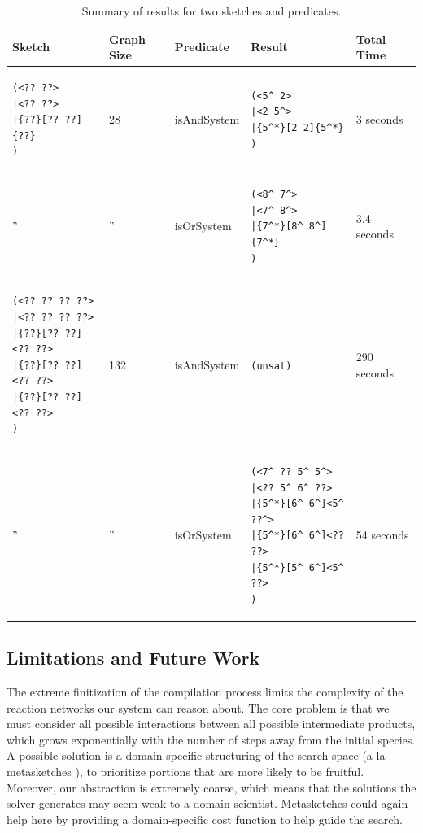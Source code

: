 \documentclass{article}[10pt]
\begin{document}
\begin{table}
\centering
\begin{tabular}{|l|l|l|l|l|}\hline
Sketch   & Graph Size & Predicate & Result & Total Time \\ \hline
\begin{lstlisting}[basicstyle=\footnotesize\ttfamily]
(<?? ??>
|<?? ??>
|{??}[?? ??]{??}
)
\end{lstlisting}
&
28
&
isAndSystem
&
\begin{lstlisting}[basicstyle=\footnotesize\ttfamily]
(<5^ 2>
|<2 5^>
|{5^*}[2 2]{5^*}
)
\end{lstlisting}
&
3 seconds
\\ \hline
''
&
''
&
isOrSystem
&
\begin{lstlisting}[basicstyle=\footnotesize\ttfamily]
(<8^ 7^>
|<7^ 8^>
|{7^*}[8^ 8^]{7^*}
)
\end{lstlisting}
&
3.4 seconds
\\ \hline
\begin{lstlisting}[basicstyle=\footnotesize\ttfamily]
(<?? ?? ?? ??>
|<?? ?? ?? ??>
|{??}[?? ??]<?? ??>
|{??}[?? ??]<?? ??>
|{??}[?? ??]<?? ??>
)
\end{lstlisting}
&
132
&
isAndSystem
&
\verb;(unsat);
&
290 seconds
\\ \hline
''
&
''
&
isOrSystem
&
\begin{lstlisting}[basicstyle=\footnotesize\ttfamily]
(<7^ ?? 5^ 5^>
|<?? 5^ 6^ ??>
|{5^*}[6^ 6^]<5^ ??^>
|{5^*}[6^ 6^]<?? ??>
|{5^*}[5^ 6^]<5^ ??>
)
\end{lstlisting}
&
54 seconds
\\ \hline
\end{tabular}
\caption{Summary of results for two sketches and predicates.}
\label{table:results}
\end{table}

\subsection{Limitations and Future Work}
The extreme finitization of the compilation process limits the complexity
of the reaction networks our system can reason about. The core problem is
that we must consider all possible interactions between all possible
intermediate products, which grows exponentially with the number of steps away
from the initial species. A possible solution
is a domain-specific structuring of the search space (a la metasketches
\cite{metasketches}), to prioritize portions that are more likely to be
fruitful. Moreover, our abstraction is extremely coarse, which means that the
solutions the solver generates may seem weak to a domain scientist.
Metasketches could again help here by providing a domain-specific
cost function to help guide the search.
\end{document}
